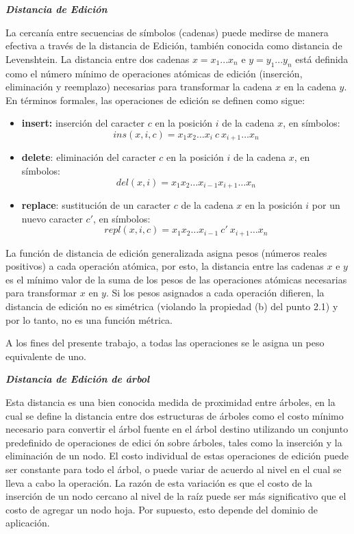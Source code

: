 \noindent \textbf{\textit{Distancia de Edici\'on}}

La cercan\'ia entre secuencias de s\'imbolos (cadenas) puede medirse de manera efectiva a trav\'es 
de la distancia de Edici\'on, tambi\'en conocida como distancia de Levenshtein. La distancia entre 
dos cadenas $x=x_1...x_n$ e $y=y_1...y_n$ est\'a definida como el n\'umero m\'inimo de operaciones 
at\'omicas de edici\'on (inserci\'on, eliminaci\'on y reemplazo) necesarias para transformar la 
cadena $x$ en la cadena $y$. En t\'erminos formales, las operaciones de edici\'on se definen como 
sigue:

\begin{itemize}
\item \textbf{insert:} inserci\'on del caracter $c$ en la posici\'on $i$
de la cadena $x$, en s\'imbolos: 
\[ins(x,i,c)=x_1 x_2 \ldots x_i\ c\ x_{i+1} \ldots x_n\]
 
\item  \textbf{delete}: eliminaci\'on del caracter $c$ en la posici\'on 
$i$ de la cadena $x$, en s\'imbolos:
  \[ del(x,i)=x_1 x_2 \ldots x_{i-1} x_{i+1} \ldots x_n\]
  
  
\item \textbf{replace}: sustituci\'on de un caracter $c$ de la cadena $x$ en 
la posici\'on $i$ por un nuevo caracter $c'$, en s\'imbolos:
\[repl(x,i,c)=x_1 x_2 \ldots x_{i-1}\ c' \ x_{i+1} \ldots x_n\]
\end{itemize}


La funci\'on de distancia de edici\'on generalizada asigna pesos (n\'umeros reales positivos) a 
cada operaci\'on at\'omica, por esto, la distancia entre las cadenas $x$ e $y$ es el m\'inimo 
valor de la suma de los pesos de las operaciones at\'omicas necesarias para transformar $x$ en $y
$. Si los pesos asignados a cada operaci\'on difieren, la distancia de edici\'on no es sim\'etrica 
(violando la propiedad (b) del punto 2.1) y por lo tanto, no es una funci\'on m\'etrica.


A los fines del presente trabajo, a todas las operaciones se le asigna un peso equivalente de uno.

\noindent \textbf{\textit{Distancia de Edici\'on de \'arbol}}

Esta distancia es una bien conocida medida de proximidad entre \'arboles, en la cual se define la 
distancia entre dos estructuras de \'arboles como el costo m\'inimo necesario para convertir el 
\'arbol fuente en el \'arbol destino utilizando un conjunto predefinido de operaciones de edici
\'on sobre \'arboles, tales como la inserci\'on y la eliminaci\'on de un nodo. El costo individual 
de estas operaciones de edici\'on puede ser constante para todo el \'arbol, o puede variar de 
acuerdo al nivel en el cual se lleva a cabo la operaci\'on. La raz\'on de esta variaci\'on es que 
el costo de la inserci\'on de un nodo cercano al nivel de la ra\'iz puede ser m\'as significativo 
que el costo de agregar un nodo hoja. Por supuesto, esto depende del dominio de aplicaci\'on.

